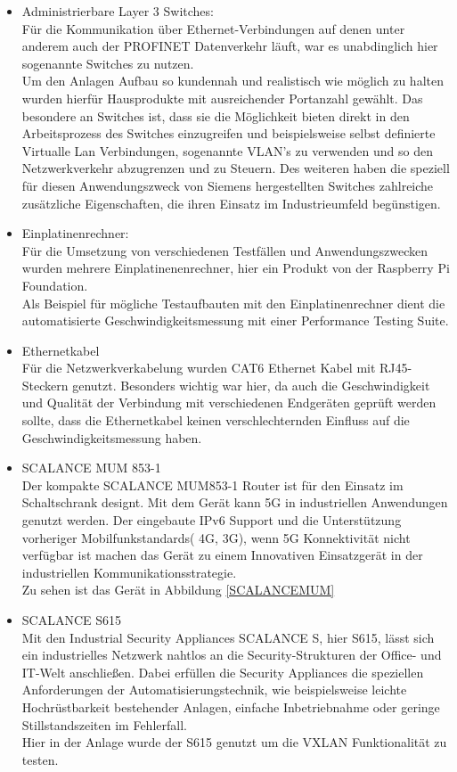 \begin{itemize}
        \item Administrierbare Layer 3 Switches: \\
                Für die Kommunikation über Ethernet-Verbindungen auf denen unter anderem auch der PROFINET Datenverkehr läuft, war es unabdinglich hier sogenannte  Switches zu nutzen. \\
                Um den Anlagen Aufbau so kundennah und realistisch wie möglich zu halten wurden hierfür Hausprodukte mit ausreichender Portanzahl gewählt. Das besondere an  Switches ist, dass sie die Möglichkeit bieten direkt in den Arbeitsprozess des Switches einzugreifen und beispielsweise selbst definierte Virtualle Lan Verbindungen, sogenannte VLAN's zu verwenden und so den Netzwerkverkehr abzugrenzen und zu Steuern. Des weiteren haben die speziell für diesen Anwendungszweck von Siemens hergestellten Switches zahlreiche zusätzliche Eigenschaften, die ihren Einsatz im Industrieumfeld begünstigen. 
        \item Einplatinenrechner: \\
                Für die Umsetzung von verschiedenen Testfällen und Anwendungszwecken wurden mehrere Einplatinenenrechner, hier ein Produkt von der Raspberry Pi Foundation. \\
                Als Beispiel für mögliche Testaufbauten mit den Einplatinenrechner dient die automatisierte Geschwindigkeitsmessung mit einer Performance Testing Suite. 
        \item Ethernetkabel \\
                Für die Netzwerkverkabelung wurden CAT6 Ethernet Kabel mit RJ45-Steckern genutzt. Besonders wichtig war hier, da auch die Geschwindigkeit und Qualität der Verbindung mit verschiedenen Endgeräten geprüft werden sollte, dass die Ethernetkabel keinen verschlechternden Einfluss auf die Geschwindigkeitsmessung haben. \\
        \item SCALANCE MUM 853-1 \\
        Der kompakte SCALANCE MUM853-1 Router ist für den Einsatz im Schaltschrank designt. Mit dem Gerät kann 5G in industriellen Anwendungen genutzt werden. Der eingebaute IPv6 Support und die Unterstützung vorheriger Mobilfunkstandards( 4G, 3G), wenn 5G Konnektivität nicht verfügbar ist machen das Gerät zu einem Innovativen Einsatzgerät in der industriellen Kommunikationsstrategie. \cite*{SCALANCEMUM} \\
        Zu sehen ist das Gerät in Abbildung \ref*{SCALANCEMUM}        
        \item SCALANCE S615 \\
        Mit den Industrial Security Appliances SCALANCE S, hier S615, lässt sich ein industrielles Netzwerk nahtlos an die Security-Strukturen der Office- und IT-Welt anschließen. Dabei erfüllen die Security Appliances die speziellen Anforderungen der Automatisierungstechnik, wie beispielsweise leichte Hochrüstbarkeit bestehender Anlagen, einfache Inbetriebnahme oder geringe Stillstandszeiten im Fehlerfall. \cite*{SCALANCES615}\\
        Hier in der Anlage wurde der S615 genutzt um die VXLAN Funktionalität zu testen.
\end{itemize}
